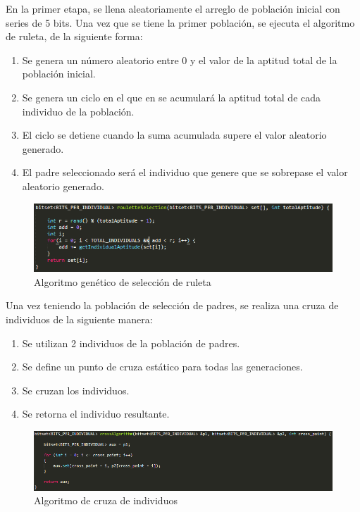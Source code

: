 \documentclass[11pt,letterpaper]{article}
\begin{document}
En la primer etapa, se llena aleatoriamente el arreglo de población inicial con series de 5 bits. Una vez que se tiene la primer población, se ejecuta el algoritmo de ruleta, de la siguiente forma:

\begin{enumerate}
	\item Se genera un número aleatorio entre 0 y el valor de la aptitud total de la población inicial.
	\item Se genera un ciclo en el que en se acumulará la aptitud total de cada individuo de la población.
	\item El ciclo se detiene cuando la suma acumulada supere el valor aleatorio generado.
	\item El padre seleccionado será el individuo que genere que se sobrepase el valor aleatorio generado. 
\end{enumerate}

\begin{figure}[H]
	\centering
	\includegraphics[scale = 1]{images/ruleta}
	\caption{Algoritmo genético de selección de ruleta}
\end{figure}

Una vez teniendo la población de selección de padres, se realiza una cruza de individuos de la siguiente manera:

\begin{enumerate}
	\item Se utilizan 2 individuos de la población de padres.
	\item Se define un punto de cruza estático para todas las generaciones.
	\item Se cruzan los individuos.
	\item Se retorna el individuo resultante.
\end{enumerate}

\begin{figure}[H]
	\centering
	\includegraphics[scale = .8]{images/cruza}
	\caption{Algoritmo de cruza de individuos}
\end{figure}
\end{document}
